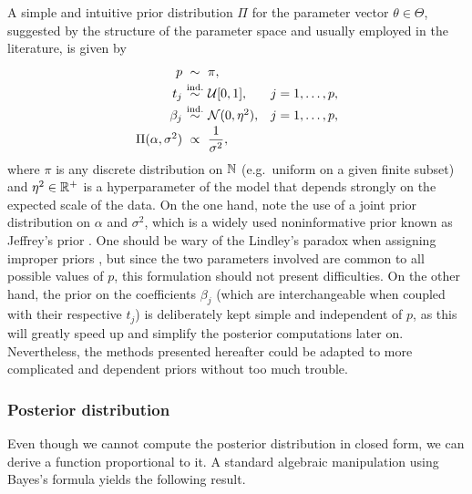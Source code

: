 A simple and intuitive prior distribution \(\Pi\) for the parameter vector \(\theta \in \Theta\), suggested by the structure of the parameter space and usually employed in the literature, is given by
\begin{equation}\label{eq:prior-linear}
  \begin{array}{r@{\ }c@{\ }l@{\quad}l}
    p                    & \sim               & \pi,                   &                \\[0.2em]
    t_j                  & \textoversim{ind.} & \mathcal{U}[0,1],      & j = 1,\dots,p, \\[0.2em]
    \beta_j              & \textoversim{ind.} & \mathcal{N}(0,\eta^2), & j = 1,\dots,p, \\[0.2em]
    \Pi(\alpha,\sigma^2) & \propto            & \dfrac{1}{\sigma^2},   &
  \end{array}
\end{equation}
where  \(\pi\) is any discrete distribution on \(\mathbb{N}\) (e.g.~uniform on a given finite subset) and \(\eta^2 \in \mathbb{R}^+\) is a hyperparameter of the model that depends strongly on the expected scale of the data. On the one hand, note the use of a joint prior distribution on \(\alpha\) and \(\sigma^2\), which is a widely used noninformative prior known as Jeffrey's prior \citep{jeffreys1946invariant}. One should be wary of the Lindley's paradox when assigning improper priors \citep[see][]{robert2014jeffreys}, but since the two parameters involved are common to all possible values of \(p\), this formulation should not present difficulties. On the other hand, the prior on the coefficients \(\beta_j\) (which are interchangeable when coupled with their respective \(t_j\)) is deliberately kept simple and independent of \(p\), as this will greatly speed up and simplify the posterior computations later on. Nevertheless, the methods presented hereafter could be adapted to more complicated and dependent priors without too much trouble.

\subsubsection*{Posterior distribution}

Even though we cannot compute the posterior distribution in closed form, we can derive a function proportional to it. A standard algebraic manipulation using Bayes's formula yields the following result.

